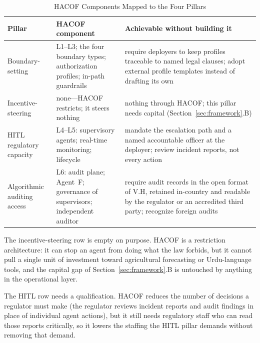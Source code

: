 \documentclass{ieeeaccess}
\newcommand{\hacof}{HACOF}
\begin{document}
\begin{table}[!t]
\caption{\hacof{} Components Mapped to the Four Pillars}
\label{tab:hacofmap}
\centering
\footnotesize
\setlength{\tabcolsep}{3pt}
\begin{tabular}{>{\raggedright\arraybackslash}p{1.6cm}>{\raggedright\arraybackslash}p{2.35cm}>{\raggedright\arraybackslash}p{3.2cm}}
\toprule
\rowcolor{darkblue!15}
\textbf{Pillar} & \textbf{\hacof{} component} & \textbf{Achievable without building it} \\
\midrule
\rowcolor{steelblue!8}
Boundary-setting & L1--L3; the four boundary types; authorization profiles; in-path guardrails & require deployers to keep profiles traceable to named legal clauses; adopt external profile templates instead of drafting its own \\
\rowcolor{tealcolor!8}
Incentive-steering & none---\hacof{} restricts; it steers nothing & nothing through \hacof; this pillar needs capital (Section~\ref{sec:framework}.B) \\
\rowcolor{ambercolor!8}
HITL regulatory capacity & L4--L5: supervisory agents; real-time monitoring; lifecycle & mandate the escalation path and a named accountable officer at the deployer; review incident reports, not every action \\
\rowcolor{slateblue!8}
Algorithmic auditing access & L6: audit plane; Agent~F; governance of supervisors; independent auditor & require audit records in the open format of V.H, retained in-country and readable by the regulator or an accredited third party; recognize foreign audits \\
\bottomrule
\end{tabular}
\end{table}

The incentive-steering row is empty on purpose. \hacof{} is a restriction architecture: it can stop an agent from doing what the law forbids, but it cannot pull a single unit of investment toward agricultural forecasting or Urdu-language tools, and the capital gap of Section~\ref{sec:framework}.B is untouched by anything in the operational layer.

The HITL row needs a qualification. \hacof{} reduces the number of decisions a regulator must make (the regulator reviews incident reports and audit findings in place of individual agent actions), but it still needs regulatory staff who can read those reports critically, so it lowers the staffing the HITL pillar demands without removing that demand.
\end{document}
